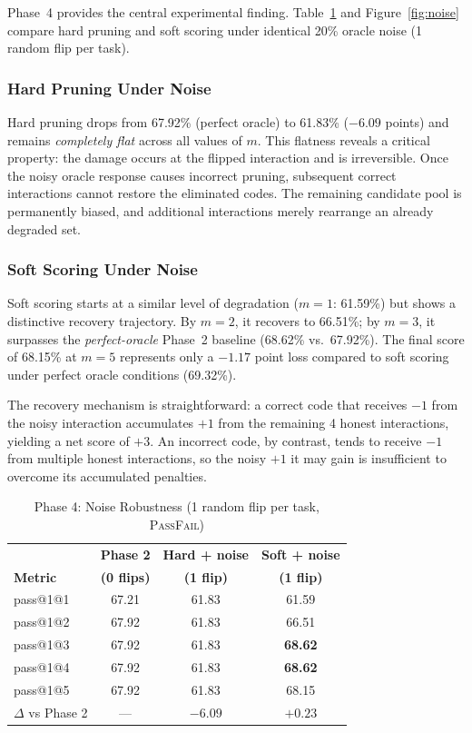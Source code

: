 \documentclass[conference]{IEEEtran}
\begin{document}
Phase~4 provides the central experimental finding. Table~\ref{tab:noise} and Figure~\ref{fig:noise} compare hard pruning and soft scoring under identical 20\% oracle noise (1 random flip per task).

\subsubsection{Hard Pruning Under Noise}

Hard pruning drops from 67.92\% (perfect oracle) to 61.83\% ($-6.09$ points) and remains \emph{completely flat} across all values of $m$. This flatness reveals a critical property: the damage occurs at the flipped interaction and is irreversible. Once the noisy oracle response causes incorrect pruning, subsequent correct interactions cannot restore the eliminated codes. The remaining candidate pool is permanently biased, and additional interactions merely rearrange an already degraded set.

\subsubsection{Soft Scoring Under Noise}

Soft scoring starts at a similar level of degradation ($m=1$: 61.59\%) but shows a distinctive recovery trajectory. By $m=2$, it recovers to 66.51\%; by $m=3$, it surpasses the \emph{perfect-oracle} Phase~2 baseline (68.62\% vs.\ 67.92\%). The final score of 68.15\% at $m=5$ represents only a $-1.17$ point loss compared to soft scoring under perfect oracle conditions (69.32\%).

The recovery mechanism is straightforward: a correct code that receives $-1$ from the noisy interaction accumulates $+1$ from the remaining 4 honest interactions, yielding a net score of $+3$. An incorrect code, by contrast, tends to receive $-1$ from multiple honest interactions, so the noisy $+1$ it may gain is insufficient to overcome its accumulated penalties.

\begin{table}[t]
\centering
\caption{Phase 4: Noise Robustness (1 random flip per task, \textsc{PassFail})}
\label{tab:noise}
\begin{tabular}{lccc}
\toprule
 & \textbf{Phase 2} & \textbf{Hard + noise} & \textbf{Soft + noise} \\
\textbf{Metric} & \textbf{(0 flips)} & \textbf{(1 flip)} & \textbf{(1 flip)} \\
\midrule
pass@1@1 & 67.21 & 61.83 & 61.59 \\
pass@1@2 & 67.92 & 61.83 & 66.51 \\
pass@1@3 & 67.92 & 61.83 & \textbf{68.62} \\
pass@1@4 & 67.92 & 61.83 & \textbf{68.62} \\
pass@1@5 & 67.92 & 61.83 & 68.15 \\
\midrule
$\Delta$ vs Phase 2 & --- & $-6.09$ & $+0.23$ \\
\bottomrule
\end{tabular}
\end{table}
\end{document}
